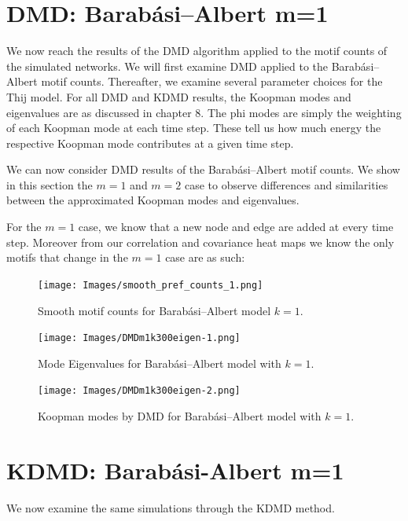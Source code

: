 \section{DMD: Barabási–Albert m=1}
We now reach the results of the DMD algorithm applied to the
motif counts of the simulated networks. We will first examine DMD applied to the 
Barabási–Albert motif counts. Thereafter, we examine several parameter choices for the Thij model.
For all DMD and KDMD results, the Koopman modes
 and eigenvalues are as discussed in chapter 8. The phi modes are simply the weighting of each Koopman mode 
 at each time step. These tell us how much energy the respective Koopman mode contributes at a given time
step.

We can now consider DMD results of the Barabási–Albert motif counts. We show in this section
the $m=1$ and $m=2$ case to observe differences and similarities between the approximated 
Koopman modes and eigenvalues. 

For the $m=1$ case, we know that a new node and edge are added at every time step. Moreover from our
correlation and covariance heat maps we know the only motifs that change in the $m=1$ case 
are as such: 

\newpage

\begin{figure}
    \texttt{[image: Images/smooth\_pref\_counts\_1.png]}
    \centering
    \caption{Smooth motif counts for Barabási–Albert model $k=1$.}
\end{figure}
\clearpage

\begin{figure}
    \texttt{[image: Images/DMDm1k300eigen-1.png]}
    \centering
    \caption{Mode Eigenvalues for Barabási–Albert model
    with $k=1$.}
\end{figure}

\begin{figure}
    \texttt{[image: Images/DMDm1k300eigen-2.png]}
    \centering
    \caption{Koopman modes by DMD for Barabási–Albert model
    with $k=1$.}
\end{figure}

\clearpage

\section{KDMD: Barabási-Albert m=1}

We now examine the same simulations through the KDMD method.

\FloatBarrier

